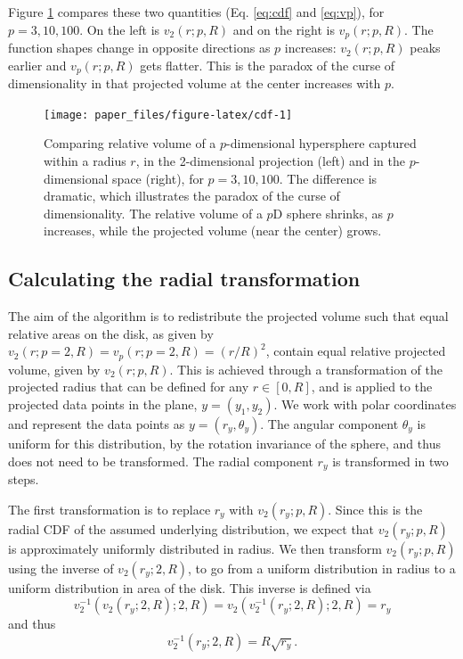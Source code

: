 \documentclass[]{interact}
\theoremstyle{plain}%
\theoremstyle{definition}
\theoremstyle{remark}
\begin{document}
Figure \ref{fig:cdf} compares these two quantities (Eq. \ref{eq:cdf} and
\ref{eq:vp}), for \(p=3, 10, 100\). On the left is \(v_{2} (r; p, R)\)
and on the right is \(v_{p} (r; p, R)\). The function shapes change in
opposite directions as \(p\) increases: \(v_{2} (r; p, R)\) peaks
earlier and \(v_{p} (r; p, R)\) gets flatter. This is the paradox of the
curse of dimensionality in that projected volume at the center increases
with \(p\).

\begin{figure}

{\centering \texttt{[image: paper\_files/figure-latex/cdf-1]} 

}

\caption{Comparing relative volume of a $p$-dimensional hypersphere captured within a radius $r$, in the 2-dimensional projection (left) and in the $p$-dimensional space (right), for $p=3, 10, 100$. The difference is dramatic, which illustrates the paradox of the curse of dimensionality. The relative volume of a $p$D sphere shrinks, as $p$ increases, while the projected volume (near the center) grows.}\label{fig:cdf}
\end{figure}

\hypertarget{calculating-the-radial-transformation}{%
\subsection{Calculating the radial
transformation}\label{calculating-the-radial-transformation}}

The aim of the algorithm is to redistribute the projected volume such
that equal relative areas on the disk, as given by
\(v_{2} (r; p=2, R)= v_p(r; p=2, R) = (r/R)^2\), contain equal relative
projected volume, given by \(v_{2} (r; p, R)\). This is achieved through
a transformation of the projected radius that can be defined for any
\(r\in[0,R]\), and is applied to the projected data points in the plane,
\(y = (y_1, y_2)\). We work with polar coordinates and represent the
data points as \(y = (r_y, \theta_y)\). The angular component
\(\theta_y\) is uniform for this distribution, by the rotation
invariance of the sphere, and thus does not need to be transformed. The
radial component \(r_y\) is transformed in two steps.

The first transformation is to replace \(r_y\) with
\(v_{2} (r_y; p, R)\). Since this is the radial CDF of the assumed
underlying distribution, we expect that \(v_{2} (r_y; p, R)\) is
approximately uniformly distributed in radius. We then transform
\(v_{2} (r_y; p, R)\) using the inverse of \(v_{2} (r_y; 2, R)\), to go
from a uniform distribution in radius to a uniform distribution in area
of the disk. This inverse is defined via \begin{equation}
v_2^{-1}(v_2(r_y; 2, R); 2, R) = v_2(v_2^{-1}(r_y; 2, R); 2, R) = r_y
\end{equation} and thus \begin{equation}
v_2^{-1}(r_y; 2, R) = R \sqrt{r_y}.
\end{equation}
\end{document}
